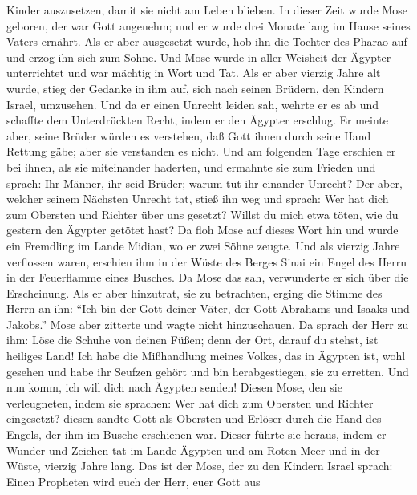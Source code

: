 Kinder auszusetzen, damit sie nicht am Leben blieben.  In
dieser Zeit wurde Mose geboren, der war Gott angenehm; und er wurde drei
Monate lang im Hause seines Vaters ernährt.  Als er aber
ausgesetzt wurde, hob ihn die Tochter des Pharao auf und erzog ihn sich
zum Sohne.  Und Mose wurde in aller Weisheit der Ägypter
unterrichtet und war mächtig in Wort und Tat.  Als er
aber vierzig Jahre alt wurde, stieg der Gedanke in ihm auf, sich nach
seinen Brüdern, den Kindern Israel, umzusehen.  Und da er
einen Unrecht leiden sah, wehrte er es ab und schaffte dem Unterdrückten
Recht, indem er den Ägypter erschlug.  Er meinte aber,
seine Brüder würden es verstehen, daß Gott ihnen durch seine Hand
Rettung gäbe; aber sie verstanden es nicht.  Und am
folgenden Tage erschien er bei ihnen, als sie miteinander haderten, und
ermahnte sie zum Frieden und sprach: Ihr Männer, ihr seid Brüder; warum
tut ihr einander Unrecht?  Der aber, welcher seinem
Nächsten Unrecht tat, stieß ihn weg und sprach: Wer hat dich zum
Obersten und Richter über uns gesetzt?  Willst du mich
etwa töten, wie du gestern den Ägypter getötet hast?  Da
floh Mose auf dieses Wort hin und wurde ein Fremdling im Lande Midian,
wo er zwei Söhne zeugte.  Und als vierzig Jahre
verflossen waren, erschien ihm in der Wüste des Berges Sinai ein Engel
des Herrn in der Feuerflamme eines Busches.  Da Mose das
sah, verwunderte er sich über die Erscheinung. Als er aber hinzutrat,
sie zu betrachten, erging die Stimme des Herrn an ihn: 
``Ich bin der Gott deiner Väter, der Gott Abrahams und Isaaks und
Jakobs.'' Mose aber zitterte und wagte nicht hinzuschauen.
 Da sprach der Herr zu ihm: Löse die Schuhe von deinen
Füßen; denn der Ort, darauf du stehst, ist heiliges Land!
 Ich habe die Mißhandlung meines Volkes, das in Ägypten
ist, wohl gesehen und habe ihr Seufzen gehört und bin herabgestiegen,
sie zu erretten. Und nun komm, ich will dich nach Ägypten senden!
 Diesen Mose, den sie verleugneten, indem sie sprachen:
Wer hat dich zum Obersten und Richter eingesetzt? diesen sandte Gott als
Obersten und Erlöser durch die Hand des Engels, der ihm im Busche
erschienen war.  Dieser führte sie heraus, indem er
Wunder und Zeichen tat im Lande Ägypten und am Roten Meer und in der
Wüste, vierzig Jahre lang.  Das ist der Mose, der zu den
Kindern Israel sprach: Einen Propheten wird euch der Herr, euer Gott aus
